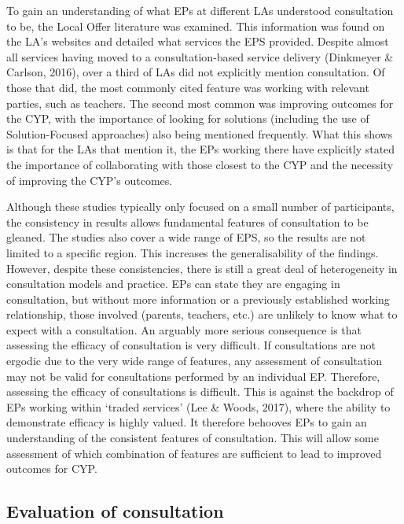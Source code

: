 \documentclass[
  english,
  man,floatsintext]{apa6}
\begin{document}
To gain an understanding of what EPs at different LAs understood
consultation to be, the Local Offer literature was examined. This
information was found on the LA's websites and detailed what services
the EPS provided. Despite almost all services having moved to a
consultation-based service delivery
(Dinkmeyer \& Carlson, 2016), over a third of LAs did
not explicitly mention consultation. Of those that did, the most
commonly cited feature was working with relevant parties, such as
teachers. The second most common was improving outcomes for the CYP,
with the importance of looking for solutions (including the use of
Solution-Focused approaches) also being mentioned frequently. What this
shows is that for the LAs that mention it, the EPs working there have
explicitly stated the importance of collaborating with those closest to
the CYP and the necessity of improving the CYP's outcomes.

Although these studies typically only focused on a small number of
participants, the consistency in results allows fundamental features of
consultation to be gleaned. The studies also cover a wide range of EPS,
so the results are not limited to a specific region. This increases the
generalisability of the findings. However, despite these consistencies,
there is still a great deal of heterogeneity in consultation models and
practice. EPs can state they are engaging in consultation, but without
more information or a previously established working relationship, those
involved (parents, teachers, etc.) are unlikely to know what to expect
with a consultation. An arguably more serious consequence is that
assessing the efficacy of consultation is very difficult. If
consultations are not ergodic due to the very wide range of features,
any assessment of consultation may not be valid for consultations
performed by an individual EP. Therefore, assessing the efficacy of
consultations is difficult. This is against the backdrop of EPs working
within `traded services' (Lee \& Woods, 2017), where the
ability to demonstrate efficacy is highly valued. It therefore behooves
EPs to gain an understanding of the consistent features of consultation.
This will allow some assessment of which combination of features are
sufficient to lead to improved outcomes for CYP.

\hypertarget{evaluation-of-consultation}{%
\subsection{Evaluation of consultation}\label{evaluation-of-consultation}}
\end{document}
